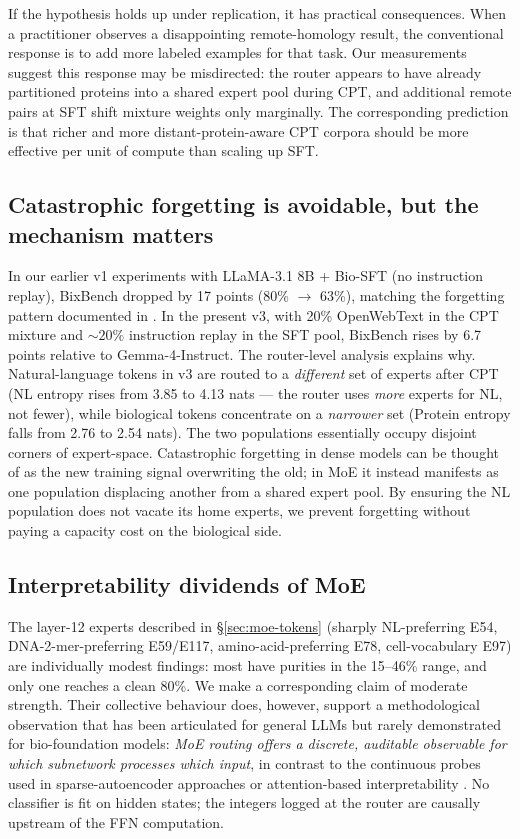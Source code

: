 \documentclass[11pt]{article}
\begin{document}
If the hypothesis holds up under replication, it has practical consequences. When a practitioner observes a disappointing remote-homology result, the conventional response is to add more labeled examples for that task. Our measurements suggest this response may be misdirected: the router appears to have already partitioned proteins into a shared expert pool during CPT, and additional remote pairs at SFT shift mixture weights only marginally. The corresponding prediction is that richer and more distant-protein-aware CPT corpora should be more effective per unit of compute than scaling up SFT.

\subsection{Catastrophic forgetting is avoidable, but the mechanism matters}

In our earlier v1 experiments with LLaMA-3.1 8B + Bio-SFT (no instruction replay), BixBench dropped by 17 points (80\% $\to$ 63\%), matching the forgetting pattern documented in \citep{luo2023forgetting, huang2024sssr}. In the present v3, with 20\% OpenWebText \citep{gadre2021pile} in the CPT mixture and $\sim 20\%$ instruction replay in the SFT pool, BixBench rises by 6.7 points relative to Gemma-4-Instruct. The router-level analysis explains why. Natural-language tokens in v3 are routed to a \emph{different} set of experts after CPT (NL entropy rises from 3.85 to 4.13 nats --- the router uses \emph{more} experts for NL, not fewer), while biological tokens concentrate on a \emph{narrower} set (Protein entropy falls from 2.76 to 2.54 nats). The two populations essentially occupy disjoint corners of expert-space. Catastrophic forgetting in dense models can be thought of as the new training signal overwriting the old; in MoE it instead manifests as one population displacing another from a shared expert pool. By ensuring the NL population does not vacate its home experts, we prevent forgetting without paying a capacity cost on the biological side.

\subsection{Interpretability dividends of MoE}

The layer-12 experts described in \S\ref{sec:moe-tokens} (sharply NL-preferring E54, DNA-2-mer-preferring E59/E117, amino-acid-preferring E78, cell-vocabulary E97) are individually modest findings: most have purities in the 15--46\% range, and only one reaches a clean 80\%. We make a corresponding claim of moderate strength. Their collective behaviour does, however, support a methodological observation that has been articulated for general LLMs \citep{kanai2025moeinterp} but rarely demonstrated for bio-foundation models: \emph{MoE routing offers a discrete, auditable observable for which subnetwork processes which input}, in contrast to the continuous probes used in sparse-autoencoder approaches \citep{templeton2024scaling, bricken2023monosemanticity} or attention-based interpretability \citep{adams2025scfminterp}. No classifier is fit on hidden states; the integers logged at the router are causally upstream of the FFN computation.
\end{document}
